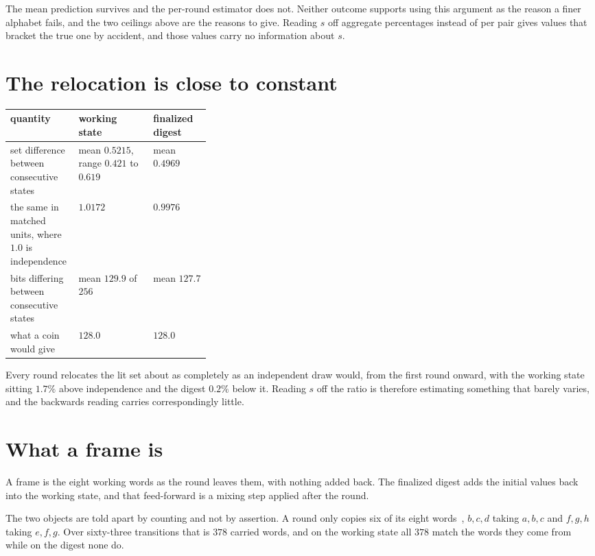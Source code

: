 The mean prediction survives and the per-round estimator does not. Neither outcome supports using this argument as the reason a finer alphabet fails, and the two ceilings above are the reasons to give. Reading \(s\) off aggregate percentages instead of per pair gives values that bracket the true one by accident, and those values carry no information about \(s\).

\section{The relocation is close to constant}

\begin{center}
\begin{tabular}{@{}p{0.34\linewidth}ll@{}}
\toprule
quantity & working state & finalized digest \\
\midrule
set difference between consecutive states & mean \(0.5215\), range \(0.421\) to \(0.619\) & mean \(0.4969\) \\
the same in matched units, where \(1.0\) is independence & \(1.0172\) & \(0.9976\) \\
bits differing between consecutive states & mean \(129.9\) of \(256\) & mean \(127.7\) \\
what a coin would give & \(128.0\) & \(128.0\) \\
\bottomrule
\end{tabular}
\end{center}

Every round relocates the lit set about as completely as an independent draw would, from the first round onward, with the working state sitting \(1.7\%\) above independence and the digest \(0.2\%\) below it. Reading \(s\) off the ratio is therefore estimating something that barely varies, and the backwards reading carries correspondingly little.

\section{What a frame is}

A frame is the eight working words as the round leaves them, with nothing added back. The finalized digest adds the initial values back into the working state, and that feed-forward is a mixing step applied after the round.

The two objects are told apart by counting and not by assertion. A round only copies six of its eight words~\cite{src:FIPS-180-4}, \(b,c,d\) taking \(a,b,c\) and \(f,g,h\) taking \(e,f,g\). Over sixty-three transitions that is \(378\) carried words, and on the working state all \(378\) match the words they come from while on the digest none do.

